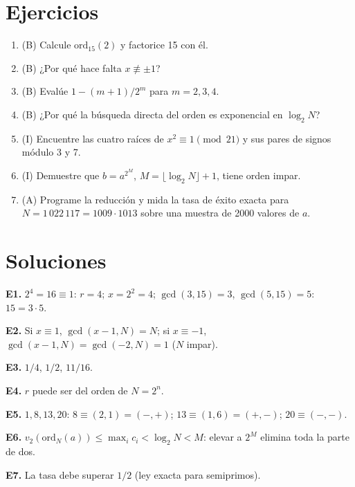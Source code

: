 \documentclass[11pt,a4paper]{article}
\begin{document}
\section{Ejercicios}
\begin{enumerate}[label=\textbf{E\arabic*.}]
\item (B) Calcule $\mathrm{ord}_{15}(2)$ y factorice 15 con él.
\item (B) ¿Por qué hace falta $x\not\equiv\pm1$?
\item (B) Evalúe $1-(m+1)/2^m$ para $m=2,3,4$.
\item (B) ¿Por qué la búsqueda directa del orden es exponencial en $\log_2N$?
\item (I) Encuentre las cuatro raíces de $x^2\equiv1\pmod{21}$ y sus pares de signos módulo 3 y 7.
\item (I) Demuestre que $b=a^{2^M}$, $M=\lfloor\log_2N\rfloor+1$, tiene orden impar.
\item (A) Programe la reducción y mida la tasa de éxito exacta para $N=1\,022\,117=1009\cdot1013$ sobre una muestra de 2000 valores de $a$.
\end{enumerate}
\section{Soluciones}
\begin{solucion}
\textbf{E1.} $2^4=16\equiv1$: $r=4$; $x=2^2=4$; $\gcd(3,15)=3$, $\gcd(5,15)=5$: $15=3\cdot5$.

\textbf{E2.} Si $x\equiv1$, $\gcd(x-1,N)=N$; si $x\equiv-1$, $\gcd(x-1,N)=\gcd(-2,N)=1$ ($N$ impar).

\textbf{E3.} $1/4$, $1/2$, $11/16$.

\textbf{E4.} $r$ puede ser del orden de $N=2^n$.

\textbf{E5.} $1,8,13,20$: $8\equiv(2,1)=(-,+)$; $13\equiv(1,6)=(+,-)$; $20\equiv(-,-)$.

\textbf{E6.} $v_2(\mathrm{ord}_N(a))\le\max_ic_i<\log_2N<M$: elevar a $2^M$ elimina toda la parte de dos.

\textbf{E7.} La tasa debe superar $1/2$ (ley exacta para semiprimos).
\end{solucion}
\end{document}
